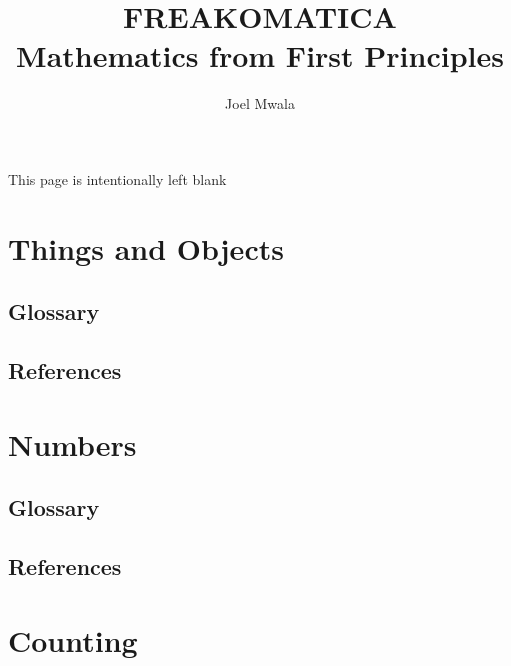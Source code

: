 \documentclass[12pt]{book}
\title{FREAKOMATICA \\\huge{Mathematics from First Principles}}
\author{Joel Mwala}
\begin{document}
\frontmatter
\maketitle
\newpage
\begin{center}
    This page is intentionally left blank
\end{center}

\newpage





\tableofcontents
\newpage









\mainmatter
\chapter{Things and Objects}%
\section{Glossary}
\section{References}
\newpage

\chapter{Numbers}%
\section{Glossary}
\section{References}
\newpage



\chapter{Counting}%
\end{document}
